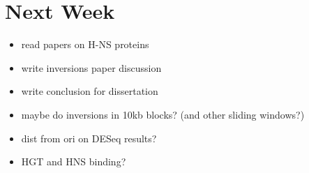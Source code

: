 \documentclass[12pt]{article}
\newcommand{\ecol}{\textit{E.\,coli}\xspace}
\begin{document}
\section*{Next Week}
\begin{itemize}
\item read papers on H-NS proteins
\item write inversions paper discussion
\item write conclusion for dissertation
	\item maybe do inversions in 10kb blocks? (and other sliding windows?)
	\item dist from ori on DESeq results?
	\item HGT and HNS binding?
\end{itemize}

\newpage

%
%
\end{document}
